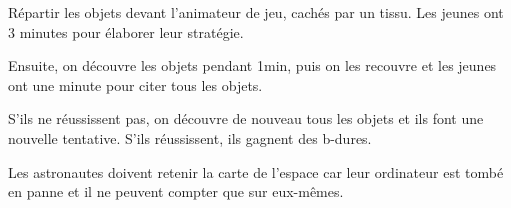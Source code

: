 \documentclass{grand-jeu}
\begin{document}
\begin{liste-materiel}
\end{liste-materiel}

\begin{regles}
Répartir les objets devant l’animateur de jeu, cachés par un tissu. Les jeunes ont 3 minutes pour élaborer leur stratégie.

Ensuite, on découvre les objets pendant 1min, puis on les recouvre et les jeunes ont une minute pour citer tous les objets.

S’ils ne réussissent pas, on découvre de nouveau tous les objets et ils font une nouvelle tentative. S’ils réussissent, ils gagnent des b-dures.
\end{regles}

\begin{imaginaire}
Les astronautes doivent retenir la carte de l’espace car leur ordinateur est tombé en panne et il ne peuvent compter que sur eux-mêmes.
\end{imaginaire}

\begin{moments-stop}
\end{moments-stop}
\end{document}
